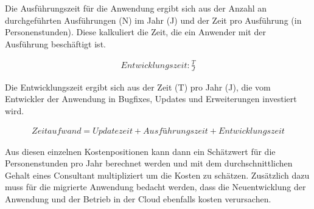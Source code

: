 Die Ausführungszeit für die Anwendung ergibt sich aus der Anzahl an durchgeführten Ausführungen (N) im Jahr (J) und der Zeit pro Ausführung (in Personenstunden). Diese kalkuliert die Zeit, die ein Anwender mit der Ausführung beschäftigt ist.

\begin{align}
    Entwicklungszeit: \frac{T}{J}
\end{align}

Die Entwicklungszeit ergibt sich aus der Zeit (T) pro Jahr (J), die vom Entwickler der Anwendung in Bugfixes, Updates und Erweiterungen investiert wird.

\begin{align}
    Zeitaufwand = Updatezeit + Ausführungszeit + Entwicklungszeit
\end{align}

Aus diesen einzelnen Kostenpositionen kann dann ein Schätzwert für die Personenstunden pro Jahr berechnet werden und mit dem durchschnittlichen Gehalt eines Consultant multipliziert um die Kosten zu schätzen. Zusätzlich dazu muss für die migrierte Anwendung bedacht werden, dass die Neuentwicklung der Anwendung und der Betrieb in der Cloud ebenfalls kosten verursachen.
\pagebreak